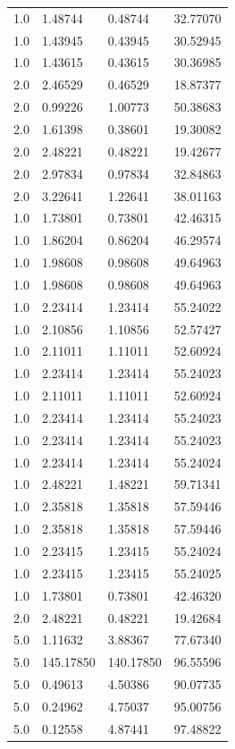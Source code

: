 \begin{longtable}{llll}
	1.0 & 1.48744 & 0.48744 & 32.77070 \\
	1.0 & 1.43945 & 0.43945 & 30.52945 \\
	1.0 & 1.43615 & 0.43615 & 30.36985 \\
	2.0 & 2.46529 & 0.46529 & 18.87377 \\
	2.0 & 0.99226 & 1.00773 & 50.38683 \\
	2.0 & 1.61398 & 0.38601 & 19.30082 \\
	2.0 & 2.48221 & 0.48221 & 19.42677 \\
	2.0 & 2.97834 & 0.97834 & 32.84863 \\
	2.0 & 3.22641 & 1.22641 & 38.01163 \\
	1.0 & 1.73801 & 0.73801 & 42.46315 \\
	1.0 & 1.86204 & 0.86204 & 46.29574 \\
	1.0 & 1.98608 & 0.98608 & 49.64963 \\
	1.0 & 1.98608 & 0.98608 & 49.64963 \\
	1.0 & 2.23414 & 1.23414 & 55.24022 \\
	1.0 & 2.10856 & 1.10856 & 52.57427 \\
	1.0 & 2.11011 & 1.11011 & 52.60924 \\
	1.0 & 2.23414 & 1.23414 & 55.24023 \\
	1.0 & 2.11011 & 1.11011 & 52.60924 \\
	1.0 & 2.23414 & 1.23414 & 55.24023 \\
	1.0 & 2.23414 & 1.23414 & 55.24023 \\
	1.0 & 2.23414 & 1.23414 & 55.24024 \\
	1.0 & 2.48221 & 1.48221 & 59.71341 \\
	1.0 & 2.35818 & 1.35818 & 57.59446 \\
	1.0 & 2.35818 & 1.35818 & 57.59446 \\
	1.0 & 2.23415 & 1.23415 & 55.24024 \\
	1.0 & 2.23415 & 1.23415 & 55.24025 \\
	1.0 & 1.73801 & 0.73801 & 42.46320 \\
	2.0 & 2.48221 & 0.48221 & 19.42684 \\
	5.0 & 1.11632 & 3.88367 & 77.67340 \\
	5.0 & 145.17850 & 140.17850 & 96.55596 \\
	5.0 & 0.49613 & 4.50386 & 90.07735 \\
	5.0 & 0.24962 & 4.75037 & 95.00756 \\
	5.0 & 0.12558 & 4.87441 & 97.48822 \\

\end{longtable}
